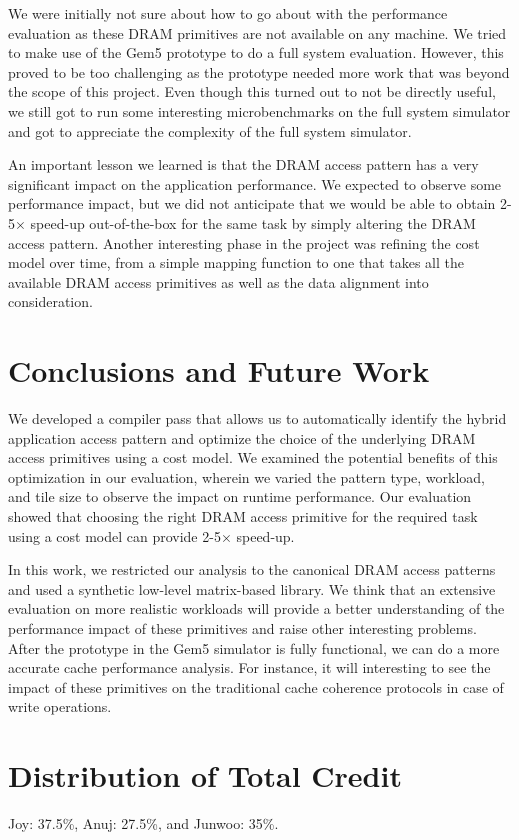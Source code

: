 \documentclass[letterpaper]{article}
\begin{document}
We were initially not sure about how to go about with the performance 
evaluation as these DRAM primitives are not available on any machine. We
tried to make use of the Gem5 prototype to do a full system evaluation. However,
this proved to be too challenging as the prototype needed more work
that was beyond the scope of this project. Even though this turned out to 
not be directly useful, we still got to run some interesting microbenchmarks on
the full system simulator and got to appreciate the complexity of the full
system simulator.

An important lesson we learned is that the DRAM access pattern has a 
very significant impact on the application performance. We expected to 
observe some performance impact, but we did not anticipate that we would
be able to obtain 2-5$\times$ speed-up out-of-the-box for the same task by
simply altering the DRAM access pattern.
Another interesting phase in the project was refining the cost model over time,
from a simple mapping function to one that takes all the available 
DRAM access primitives as well as the data alignment into consideration.

\section{Conclusions and Future Work}

We developed a compiler pass that allows us to automatically identify the hybrid
application access pattern and optimize the choice of the underlying DRAM access
primitives using a cost model.
We examined the potential benefits of this optimization in our evaluation,
wherein we varied the pattern type, workload, and tile size to observe the
impact on runtime performance.
Our evaluation showed that choosing the right DRAM access primitive for
the required task using a cost model can provide 2-5$\times$ speed-up.

In this work, we restricted our analysis to the canonical DRAM access patterns
and used a synthetic low-level matrix-based library. We think that an
extensive evaluation on more realistic workloads will provide a better 
understanding of the performance impact of these primitives and raise 
other interesting problems. After the prototype in the Gem5 simulator is
fully functional, we can do a more accurate cache performance analysis.
For instance, it will interesting to see the impact of these primitives on
the traditional cache coherence protocols in case of write operations.

\section{Distribution of Total Credit}

Joy: 37.5\%, Anuj: 27.5\%, and Junwoo: 35\%.



\end{document}
